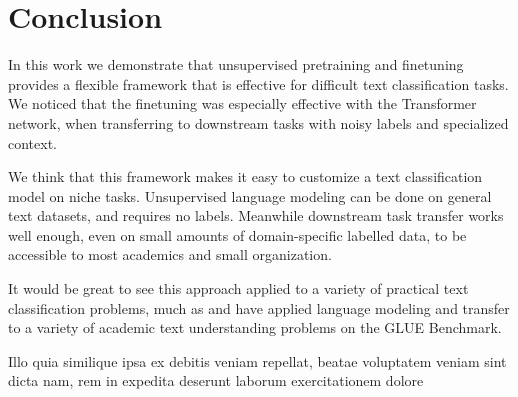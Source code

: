 \documentclass[letterpaper]{article} %
\begin{document}
\section{Conclusion}
In this work we demonstrate that unsupervised pretraining and finetuning provides a flexible framework that is effective for difficult text classification tasks.
We noticed that the finetuning was especially effective with the Transformer network, when transferring to downstream tasks with noisy labels and specialized context.

We think that this framework makes it easy to customize a text classification model on niche tasks. Unsupervised language modeling can be done on general text datasets, and requires no labels. Meanwhile downstream task transfer works well enough, even on small amounts of domain-specific labelled data, to be accessible to most academics and small organization.

It would be great to see this approach applied to a variety of practical text classification problems, much as \cite{Radford2018} and \cite{devlin2018bert} have applied language modeling and transfer to a variety of academic text understanding problems on the GLUE Benchmark.



Illo quia similique ipsa ex debitis veniam repellat, beatae voluptatem veniam sint dicta nam, rem in expedita deserunt laborum exercitationem dolore


\end{document}
